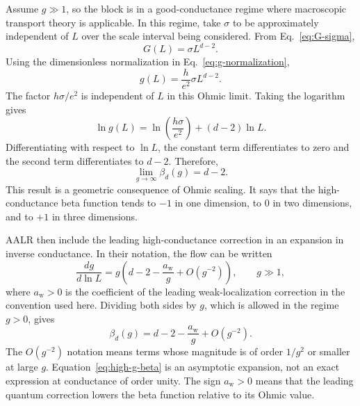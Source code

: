 \documentclass[11pt,a4paper]{article}
\numberwithin{equation}{section}
\begin{document}
Assume $g\gg 1$, so the block is in a good-conductance regime where macroscopic transport theory is applicable. In this regime, take $\sigma$ to be approximately independent of $L$ over the scale interval being considered. From Eq.~\eqref{eq:G-sigma},
\begin{equation}
    G(L)=\sigma L^{d-2}.
\end{equation}
Using the dimensionless normalization in Eq.~\eqref{eq:g-normalization},
\begin{equation}
    g(L)=\frac{h}{e^2}\sigma L^{d-2}.
\end{equation}
The factor $h\sigma/e^2$ is independent of $L$ in this Ohmic limit. Taking the logarithm gives
\begin{equation}
    \ln g(L)=\ln\left(\frac{h\sigma}{e^2}\right)+(d-2)\ln L.
\end{equation}
Differentiating with respect to $\ln L$, the constant term differentiates to zero and the second term differentiates to $d-2$. Therefore,
\begin{equation}
    \lim_{g\to\infty}\beta_d(g)=d-2.
    \label{eq:large-g-limit}
\end{equation}
This result is a geometric consequence of Ohmic scaling. It says that the high-conductance beta function tends to $-1$ in one dimension, to $0$ in two dimensions, and to $+1$ in three dimensions.

AALR then include the leading high-conductance correction in an expansion in inverse conductance. In their notation, the flow can be written
\begin{equation}
    \frac{dg}{d\ln L}=g\left(d-2-\frac{a_{\mathrm{w}}}{g}
    +O\!\left(g^{-2}\right)\right),
    \qquad g\gg 1,
    \label{eq:high-g-flow}
\end{equation}
where $a_{\mathrm{w}}>0$ is the coefficient of the leading weak-localization correction in the convention used here. Dividing both sides by $g$, which is allowed in the regime $g>0$, gives
\begin{equation}
    \beta_d(g)=d-2-\frac{a_{\mathrm{w}}}{g}
    +O\!\left(g^{-2}\right).
    \label{eq:high-g-beta}
\end{equation}
The $O(g^{-2})$ notation means terms whose magnitude is of order $1/g^2$ or smaller at large $g$. Equation~\eqref{eq:high-g-beta} is an asymptotic expansion, not an exact expression at conductance of order unity. The sign $a_{\mathrm{w}}>0$ means that the leading quantum correction lowers the beta function relative to its Ohmic value.
\end{document}
